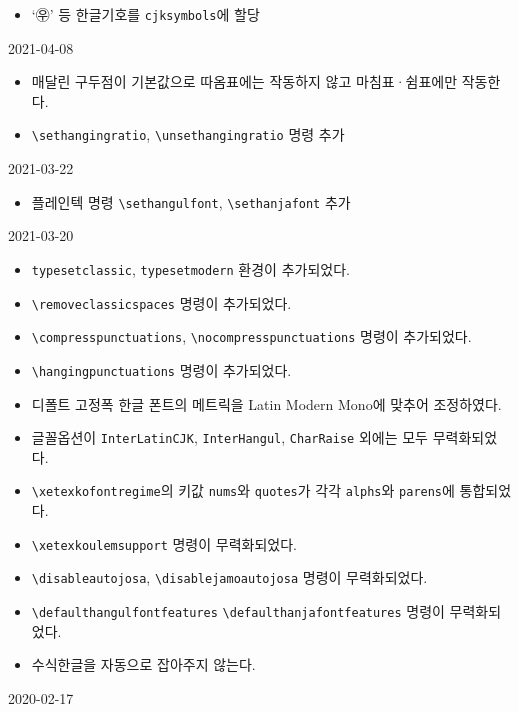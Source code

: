 \documentclass[a4paper]{article}
\def\cs#1{\texttt{\textbackslash #1}}
\begin{document}
\begin{small}
\begin{description}
\begin{itemize}
        \item `㉾' 등 한글기호를 \verb=cjksymbols=에 할당
      \end{itemize}
    \item[v3.2] 2021-04-08
      \begin{itemize}
        \item 매달린 구두점이 기본값으로 따옴표에는 작동하지 않고 마침표^^b7쉼표에만 작동한다.
        \item \cs{sethangingratio}, \cs{unsethangingratio} 명령 추가
      \end{itemize}
    \item[v3.1] 2021-03-22
      \begin{itemize}
        \item 플레인텍 명령 \cs{sethangulfont}, \cs{sethanjafont} 추가
      \end{itemize}
    \item[v3.0] 2021-03-20
      \begin{itemize}
        \item \verb|typesetclassic|, \verb|typesetmodern| 환경이 추가되었다.
        \item \cs{removeclassicspaces} 명령이 추가되었다.
        \item \cs{compresspunctuations}, \cs{nocompresspunctuations} 명령이 추가되었다.
        \item \cs{hangingpunctuations} 명령이 추가되었다.
        \item 디폴트 고정폭 한글 폰트의 메트릭을 Latin Modern Mono에
          맞추어 조정하였다.
        \item 글꼴옵션이 \verb|InterLatinCJK|, \verb|InterHangul|, \verb|CharRaise|
          외에는 모두 무력화되었다.
        \item \cs{xetexkofontregime}의 키값 \verb|nums|와 \verb|quotes|가
          각각 \verb|alphs|와 \verb|parens|에 통합되었다.
        \item \cs{xetexkoulemsupport} 명령이 무력화되었다.
        \item \cs{disableautojosa}, \cs{disablejamoautojosa} 명령이 무력화되었다.
        \item \cs{defaulthangulfontfeatures} \cs{defaulthanjafontfeatures}
          명령이 무력화되었다.
        \item 수식한글을 자동으로 잡아주지 않는다.
      \end{itemize}
    \item[v2.23] 2020-02-17
\end{description}
\end{small}
\end{document}
